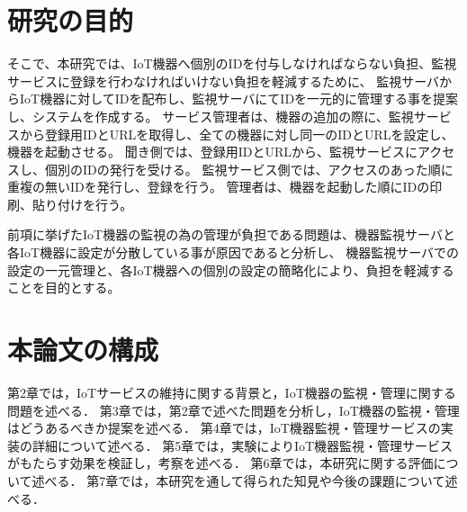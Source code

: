 \section{研究の目的}
そこで、本研究では、IoT機器へ個別のIDを付与しなければならない負担、監視サービスに登録を行わなければいけない負担を軽減するために、
監視サーバからIoT機器に対してIDを配布し、監視サーバにてIDを一元的に管理する事を提案し、システムを作成する。
サービス管理者は、機器の追加の際に、監視サービスから登録用IDとURLを取得し、全ての機器に対し同一のIDとURLを設定し、機器を起動させる。
聞き側では、登録用IDとURLから、監視サービスにアクセスし、個別のIDの発行を受ける。
監視サービス側では、アクセスのあった順に重複の無いIDを発行し、登録を行う。
管理者は、機器を起動した順にIDの印刷、貼り付けを行う。

前項に挙げたIoT機器の監視の為の管理が負担である問題は、機器監視サーバと各IoT機器に設定が分散している事が原因であると分析し、
機器監視サーバでの設定の一元管理と、各IoT機器への個別の設定の簡略化により、負担を軽減することを目的とする。

\section{本論文の構成}
第2章では，IoTサービスの維持に関する背景と，IoT機器の監視・管理に関する問題を述べる．
第3章では，第2章で述べた問題を分析し，IoT機器の監視・管理はどうあるべきか提案を述べる．
第4章では，IoT機器監視・管理サービスの実装の詳細について述べる．
第5章では，実験によりIoT機器監視・管理サービスがもたらす効果を検証し，考察を述べる．
第6章では，本研究に関する評価について述べる．
第7章では，本研究を通して得られた知見や今後の課題について述べる．


